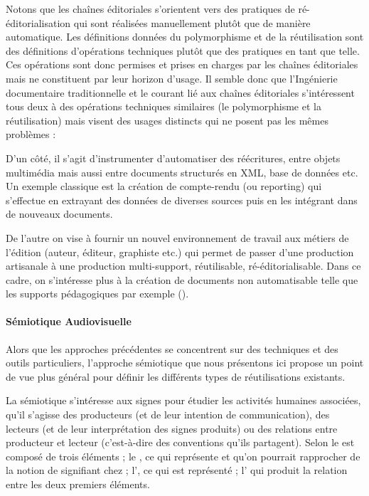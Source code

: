 Notons que les chaînes éditoriales s'orientent vers des pratiques de ré-éditorialisation qui sont réalisées manuellement plutôt que de manière automatique.
Les définitions données du polymorphisme et de la réutilisation sont des définitions d'opérations techniques plutôt que des pratiques en tant que telle. 
Ces opérations sont donc permises et prises en charges par les chaînes éditoriales mais ne constituent par leur horizon d'usage.
Il semble donc que l'Ingénierie documentaire traditionnelle et le courant lié aux chaînes éditoriales s'intéressent tous deux à des opérations techniques similaires (le polymorphisme et la réutilisation) mais visent des usages distincts qui ne posent pas les mêmes problèmes :
\begin{liste}
	\item D'un côté, il s'agit d'instrumenter d'automatiser des réécritures, entre objets multimédia mais aussi entre documents structurés en XML, base de données etc. 
	Un exemple classique est la création de compte-rendu (ou reporting) qui s'effectue en extrayant des données de diverses sources puis en les intégrant dans de nouveaux documents.

	\item De l'autre on vise à fournir un nouvel environnement de travail aux métiers de l'édition (auteur, éditeur, graphiste etc.) qui permet de passer d'une production artisanale à une production multi-support, réutilisable, ré-éditorialisable. 
	Dans ce cadre, on s'intéresse plus à la création de documents non automatisable telle que les supports pédagogiques par exemple (\cite{Crozat2007}).\\
\end{liste}


\paragraph{Sémiotique Audiovisuelle}
Alors que les approches précédentes se concentrent sur des techniques et des outils particuliers, l'approche sémiotique que nous présentons ici propose un point de vue plus général pour définir les différents types de réutilisations existants. 

La sémiotique s'intéresse aux signes pour étudier les activités humaines associées, qu'il s'agisse des producteurs (et de leur intention de communication), des lecteurs (et de leur interprétation des signes produits) ou des relations entre producteur et lecteur (c'est-à-dire des conventions qu'ils partagent). 
Selon \cite{Peirce1978} le  est composé de trois éléments ; le , ce qui représente et qu'on pourrait rapprocher de la notion de signifiant chez \cite{DeSaussure1995} ; l', ce qui est représenté ; l' qui produit la relation entre les deux premiers éléments. 

